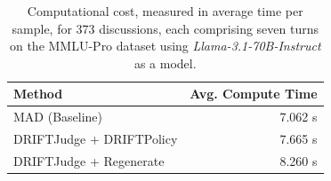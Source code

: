\begin{table}[H]
\centering
\small
\begin{tabular}{lr}
\toprule
\textbf{Method} & \textbf{Avg. Compute Time} \\
\midrule
MAD (Baseline) & 7.062 s \\
DRIFTJudge + DRIFTPolicy & 7.665 s \\
DRIFTJudge + Regenerate & 8.260 s \\
\bottomrule
\end{tabular}
\caption{Computational cost, measured in average time per sample, for 373 discussions, each comprising seven turns on the MMLU-Pro dataset using \textit{Llama-3.1-70B-Instruct} as a model.}
\label{tab:compute}
\end{table}
